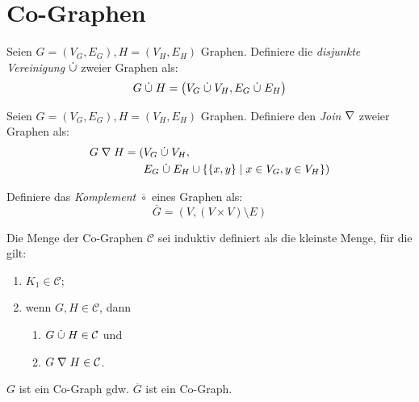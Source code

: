 \chapter{Co-Graphen}

\begin{definition}
    Seien $ G = (V_G, E_G), H = (V_H, E_H) $ Graphen.
    Definiere die \textit{disjunkte Vereinigung} $ \mathrel{\dot{\cup}} $ zweier Graphen als:
    \begin{equation*}
        G \mathrel{\dot{\cup}} H = \big(V_G \mathrel{\dot{\cup}} V_H, E_G \mathrel{\dot{\cup}} E_H\big)
    \end{equation*}
\end{definition}

\begin{definition}[Join]
    Seien $ G = (V_G, E_G), H = (V_H, E_H) $ Graphen.
    Definiere den \textit{Join} $ \mathrel{\nabla} $ zweier Graphen als:
    \begin{align*}
        G \mathrel{\nabla} H = (& V_G \mathrel{\dot{\cup}} V_H, \\
        & E_G \mathrel{\dot{\cup}} E_H \cup \{ \{ x, y \} \mid x \in V_G, y \in V_H \})
    \end{align*}
\end{definition}

\begin{definition}[Komplement]
    Definiere das \textit{Komplement} $ \overline{\circ} $ eines Graphen als:
    \begin{equation*}
        \overline{G} = (V, (V \times V) \setminus E)
    \end{equation*}
\end{definition}

\begin{definition}[Co-Graphen]
    Die Menge der Co-Graphen $ \mathcal{C} $ sei induktiv definiert als die kleinste Menge, für die gilt:
    \begin{enumerate}
        \item $ K_1 \in \mathcal{C} $;
        \item wenn $ G, H \in \mathcal{C} $, dann \begin{enumerate}
            \item $ G \mathrel{\dot{\cup}} H \in \mathcal{C} $ und
            \item $ G \mathrel{\nabla} H \in \mathcal{C} $.
        \end{enumerate}
    \end{enumerate}
\end{definition}

\begin{proposition}
    $ G $ ist ein Co-Graph gdw. $ \overline{G} $ ist ein Co-Graph.
\end{proposition}

